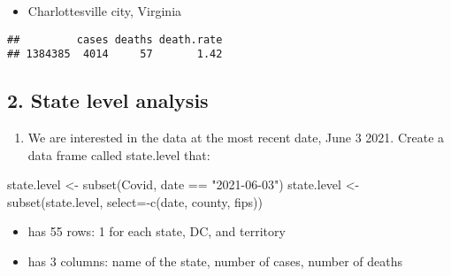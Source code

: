 \documentclass[
]{article}
\newenvironment{Shaded}{\begin{snugshade}}{\end{snugshade}}
\newcommand{\AttributeTok}[1]{\textcolor[rgb]{0.77,0.63,0.00}{#1}}
\newcommand{\DecValTok}[1]{\textcolor[rgb]{0.00,0.00,0.81}{#1}}
\newcommand{\FunctionTok}[1]{\textcolor[rgb]{0.00,0.00,0.00}{#1}}
\newcommand{\NormalTok}[1]{#1}
\newcommand{\OtherTok}[1]{\textcolor[rgb]{0.56,0.35,0.01}{#1}}
\newcommand{\SpecialCharTok}[1]{\textcolor[rgb]{0.00,0.00,0.00}{#1}}
\newcommand{\StringTok}[1]{\textcolor[rgb]{0.31,0.60,0.02}{#1}}
\providecommand{\tightlist}{%
  \setlength{\itemsep}{0pt}\setlength{\parskip}{0pt}}
\begin{document}
\begin{itemize}
\tightlist
\item
  Charlottesville city, Virginia
\end{itemize}

\begin{Shaded}
\end{Shaded}

\begin{verbatim}
##         cases deaths death.rate
## 1384385  4014     57       1.42
\end{verbatim}

\hypertarget{state-level-analysis}{%
\subsection{2. State level analysis}\label{state-level-analysis}}

\begin{enumerate}
\def\labelenumi{\alph{enumi}.}
\tightlist
\item
  We are interested in the data at the most recent date, June 3 2021.
  Create a data frame called state.level that:
\end{enumerate}

\begin{Shaded}
\begin{Highlighting}[]
\NormalTok{state.level }\OtherTok{\textless{}{-}} \FunctionTok{subset}\NormalTok{(Covid, date }\SpecialCharTok{==} \StringTok{"2021{-}06{-}03"}\NormalTok{)}
\NormalTok{state.level }\OtherTok{\textless{}{-}} \FunctionTok{subset}\NormalTok{(state.level, }\AttributeTok{select=}\SpecialCharTok{{-}}\FunctionTok{c}\NormalTok{(date, county, fips))}
\end{Highlighting}
\end{Shaded}

\begin{itemize}
\tightlist
\item
  has 55 rows: 1 for each state, DC, and territory
\item
  has 3 columns: name of the state, number of cases, number of deaths
\end{itemize}
\end{document}
